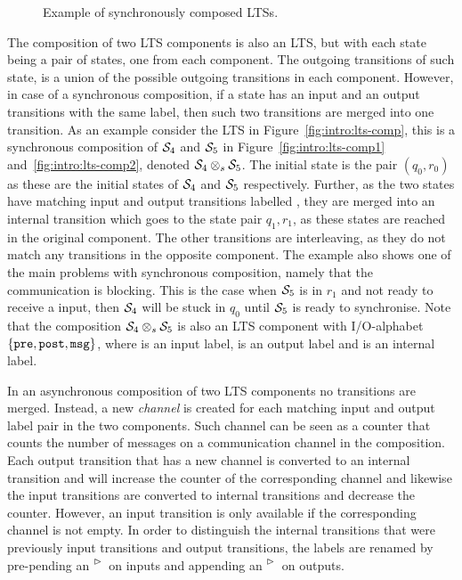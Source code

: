 \begin{figure}[ht]         
\centering
    \caption{Example of synchronously composed LTSs.}
    \label{fig:lts-file-comp}
\end{figure} 

The composition of two LTS components is also an LTS, but with each state being a pair of states, one from each component. The outgoing transitions of such state, is a union of the possible outgoing transitions in each component. However, in case of a synchronous composition, if a state has an input and an output transitions with the same label, then such two transitions are merged into one transition. As an example consider the LTS in Figure~\ref{fig:intro:lts-comp}, this is a synchronous composition of $\S_4$ and $\S_5$ in Figure~\ref{fig:intro:lts-comp1} and~\ref{fig:intro:lts-comp2}, denoted $\S_4 \sync \S_5$. 
The initial state is the pair $(q_0,r_0)$ as these are the initial states of $\S_4$ and $\S_5$ respectively. Further, as the two states have matching input and output transitions labelled , they are merged into an internal 
 transition which goes to the state pair ${q_1,r_1}$, as these states are reached in the original component. 
The other transitions are interleaving, as they do not match any transitions in the opposite component. The example also shows one of the main problems with synchronous composition, namely that the communication is blocking. This is the case when $\S_5$ is in $r_1$ and not ready to receive a  input, then  $\S_4$ will be stuck in $q_0$ until $\S_5$ is ready to synchronise. Note that the composition $\S_4 \sync \S_5$ is also an LTS component with I/O-alphabet $\{\transition{pre},\transition{post},\transition{msg}\}$, where  is an input label,  is an output label and  is an internal label. 

In an asynchronous composition of two LTS components no transitions are merged. Instead, a new \emph{channel} is created for each matching input and output label pair in the two components. Such channel can be seen as a counter that counts the number of messages on a communication channel in the composition. Each output transition that has a new channel is converted to an internal transition and will increase the counter of the corresponding channel and likewise the input transitions are converted to internal transitions and decrease the counter. However, an input transition is only available if the corresponding channel is not empty. In order to distinguish the internal transitions that were previously input transitions and output transitions, the labels are renamed by pre-pending an $\inact{~}$ on inputs and appending an $\inact{~}$ on outputs.

